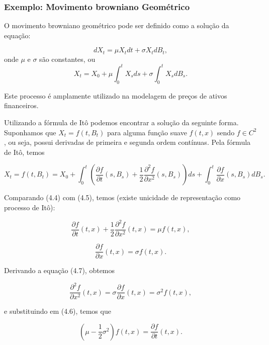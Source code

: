 \documentclass[12pt,openright,oneside,a4paper]{abntex2}
\numberwithin{equation}{section}
\begin{document}
\subsubsection{Exemplo: Movimento browniano Geométrico}

O movimento browniano geométrico pode ser definido como a solução da equação:


\begin{equation}
    dX_t = \mu X_t dt + \sigma X_t dB_t,
\end{equation}
onde $\mu$ e $\sigma$ são constantes, ou
\begin{equation}
    X_t = X_0 + \mu \int_0^t X_s ds + \sigma \int_0^t X_s dB_s.
\end{equation}

Este processo é amplamente utilizado na modelagem de preços de ativos financeiros.

Utilizando a fórmula de Itô podemos encontrar a solução da seguinte forma. Suponhamos que $X_t = f(t, B_t)$ para alguma função suave $f(t, x)$ sendo $f \in C^{2}$, ou seja, possui derivadas de primeira e segunda ordem contínuas. Pela fórmula de Itô, temos

\begin{equation}
    X_t = f(t, B_t) = X_0 + \int_0^t \left( \frac{\partial f}{\partial t} (s, B_s) + \frac{1}{2} \frac{\partial^2 f}{\partial x^2} (s, B_s) \right) ds
    + \int_0^t \frac{\partial f}{\partial x} (s, B_s) dB_s.
\end{equation}

Comparando (4.4) com (4.5), temos (existe unicidade de representação como processo de Itô):

\begin{equation}
    \frac{\partial f}{\partial t} (t, x) + \frac{1}{2} \frac{\partial^2 f}{\partial x^2} (t, x) = \mu f(t, x),
\end{equation}

\begin{equation}
    \frac{\partial f}{\partial x} (t, x) = \sigma f(t, x).
\end{equation}

Derivando a equação (4.7), obtemos

\[
\frac{\partial^2 f}{\partial x^2} (t, x) = \sigma \frac{\partial f}{\partial x} (t, x) = \sigma^2 f(t, x),
\]

e substituindo em (4.6), temos que

\[
\left( \mu - \frac{1}{2} \sigma^2 \right) f(t, x) = \frac{\partial f}{\partial t} (t, x).
\]
\end{document}
